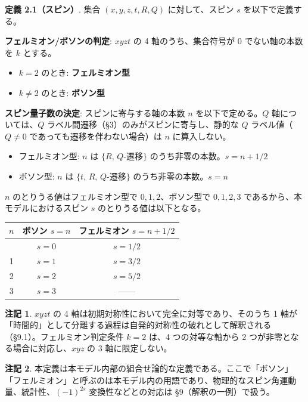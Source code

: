 \documentclass[
  a4paper,11pt]{ltjsarticle}
\newcounter{none}
\providecommand{\tightlist}{%
  \setlength{\itemsep}{0pt}\setlength{\parskip}{0pt}}
\theoremstyle{definition}
\theoremstyle{remark}
\begin{document}
\textbf{定義 2.1（スピン）}. 集合 \((x, y, z, t, R, Q)\)
に対して、スピン \(s\) を以下で定義する。

\textbf{フェルミオン/ボソンの判定}: \(xyzt\) の 4 軸のうち、集合符号が
\(0\) でない軸の本数を \(k\) とする。

\begin{itemize}
\tightlist
\item
  \(k = 2\) のとき: \textbf{フェルミオン型}
\item
  \(k \neq 2\) のとき: \textbf{ボソン型}
\end{itemize}

\textbf{スピン量子数の決定}: スピンに寄与する軸の本数 \(n\)
を以下で定める。\(Q\) 軸については、\(Q\)
ラベル間遷移（§3）のみがスピンに寄与し、静的な \(Q\)
ラベル値（\(Q \neq 0\) であっても遷移を伴わない場合）は \(n\)
に算入しない。

\begin{itemize}
\tightlist
\item
  フェルミオン型: \(n\) は \(\{R,\, Q\text{-遷移}\}\)
  のうち非零の本数。\(s = n + 1/2\)
\item
  ボソン型: \(n\) は \(\{t,\, R,\, Q\text{-遷移}\}\)
  のうち非零の本数。\(s = n\)
\end{itemize}

\(n\) のとりうる値はフェルミオン型で \(0, 1, 2\)、ボソン型で
\(0, 1, 2, 3\) であるから、本モデルにおけるスピン \(s\)
のとりうる値は以下となる。

{\def\LTcaptype{none} %
\begin{longtable}[]{@{}ccc@{}}
\toprule\noalign{}
\(n\) & ボソン \(s = n\) & フェルミオン \(s = n + 1/2\) \\
\midrule\noalign{}
\endhead
\bottomrule\noalign{}
\endlastfoot
0 & \(s = 0\) & \(s = 1/2\) \\
1 & \(s = 1\) & \(s = 3/2\) \\
2 & \(s = 2\) & \(s = 5/2\) \\
3 & \(s = 3\) & ------ \\
\end{longtable}
}

\textbf{注記 1}. \(xyzt\) の 4
軸は初期対称性において完全に対等であり、そのうち 1
軸が「時間的」として分離する過程は自発的対称性の破れとして解釈される（§9.1）。フェルミオン判定条件
\(k = 2\) は、4 つの対等な軸から 2 つが非零となる場合に対応し、\(xyz\)
の 3 軸に限定しない。

\textbf{注記 2}.
本定義は本モデル内部の組合せ論的な定義である。ここで「ボソン」「フェルミオン」と呼ぶのは本モデル内の用語であり、物理的なスピン角運動量、統計性、\((-1)^{2s}\)
変換性などとの対応は §9（解釈の一例）で扱う。
\end{document}
